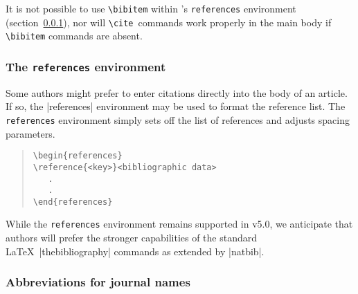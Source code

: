 \documentclass[preprint2]{aastex}
\begin{document}
It is not possible to use \verb"\bibitem" 
within \aastex's \texttt{references} environment 
(section~\ref{refenv}), 
nor will \verb"\cite"\ commands work properly in the main body 
if \verb"\bibitem" commands are absent. 
 
 
\subsubsection{The {\tt references} environment}\label{refenv} 
 
Some authors might prefer to enter citations directly 
into the body of an article. If so, the |references| environment may be 
used to format the reference list. The 
\texttt{references}  environment 
simply sets off 
the list of references and adjusts spacing parameters. 
\begin{quote} 
\begin{verbatim} 
\begin{references} 
\reference{<key>}<bibliographic data> 
   . 
   . 
\end{references} 
\end{verbatim} 
\end{quote} 
 
While the 
\texttt{references}  environment 
remains supported in v5.0, 
we anticipate that authors will prefer the stronger capabilities of 
the standard \LaTeX\ |thebibliography| commands as extended by |natbib|. 
 
\subsubsection{Abbreviations for journal names} 
 
\end{document}
